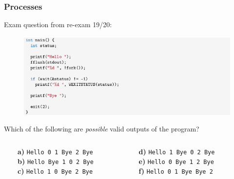 \documentclass{beamer}
\begin{document}
%
%
%
\begin{frame}
\frametitle{Processes}
Exam question from re-exam 19/20:

\vspace{-3mm}
\begin{figure}
\includegraphics[width=1.0\textwidth]{images/exam_question_1_fork.png}
\end{figure}
\vspace{-3mm}
Which of the following are \textit{possible} valid outputs of the program?
\vspace{2mm}

\begin{columns}
\begin{column}{0.5\textwidth}
\footnotesize
\ \ \ \ \textbf{a)} \texttt{Hello 0 1 Bye 2 Bye}\\
\ \ \ \ \textbf{b)} \texttt{Hello Bye 1 0 2 Bye}\\
\ \ \ \ \textbf{c)} \texttt{Hello 1 0 Bye 2 Bye}
\end{column}
\begin{column}{0.5\textwidth}  %
\footnotesize
\textbf{d)} \texttt{Hello 1 Bye 0 2 Bye}\\
\textbf{e)} \texttt{Hello 0 Bye 1 2 Bye}\\
\textbf{f)} \texttt{Hello 0 1 Bye Bye 2}
\end{column}
\end{columns}

\end{frame}


\end{document}
